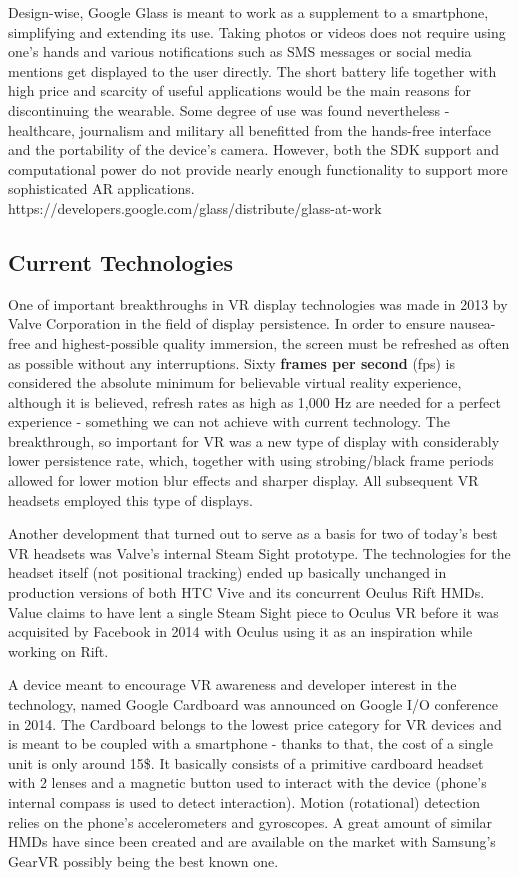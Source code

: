 \documentclass[12pt, a4paper]{article}
\begin{document}
Design-wise, Google Glass is meant to work as a supplement to a smartphone, simplifying and extending its use. Taking photos or videos does not require using one’s hands and various notifications such as SMS messages or social media mentions get displayed to the user directly. The short battery life together with high price and scarcity of useful applications would be the main reasons for discontinuing the wearable. Some degree of use was found nevertheless - healthcare, journalism and military all benefitted from the hands-free interface and the portability of the device’s camera. However, both the SDK support and computational power do not provide nearly enough functionality to support more sophisticated AR applications.
https://developers.google.com/glass/distribute/glass-at-work

\subsection{Current Technologies}

One of important breakthroughs in VR display technologies was made in 2013 by Valve Corporation in the field of display persistence. In order to ensure nausea-free and highest-possible quality immersion, the screen must be refreshed as often as possible without any interruptions. Sixty \textbf{frames per second} (fps) is considered the absolute minimum for believable virtual reality experience, although it is believed, refresh rates as high as 1,000 Hz are needed for a perfect experience - something we can not achieve with current technology. The breakthrough, so important for VR was a new type of display with considerably lower persistence rate, which, together with using strobing/black frame periods allowed for lower motion blur effects and sharper display. All subsequent VR headsets employed this type of displays.

Another development that turned out to serve as a basis for two of today’s best VR headsets was Valve’s internal Steam Sight prototype. The technologies for the headset itself (not positional tracking) ended up basically unchanged in production versions of both HTC Vive and its concurrent Oculus Rift HMDs. Value claims to have lent a single Steam Sight piece to Oculus VR before it was acquisited by Facebook in 2014 with Oculus using it as an inspiration while working on Rift.

A device meant to encourage VR awareness and developer interest in the technology, named Google Cardboard was announced on Google I/O conference in 2014. The Cardboard belongs to the lowest price category for VR devices and is meant to be coupled with a smartphone - thanks to that, the cost of a single unit is only around 15\$. It basically consists of a primitive cardboard headset with 2 lenses and a magnetic button used to interact with the device (phone’s internal compass is used to detect interaction). Motion (rotational) detection relies on the phone’s accelerometers and gyroscopes. A great amount of similar HMDs have since been created and are available on the market with Samsung’s GearVR possibly being the best known one.
\end{document}
